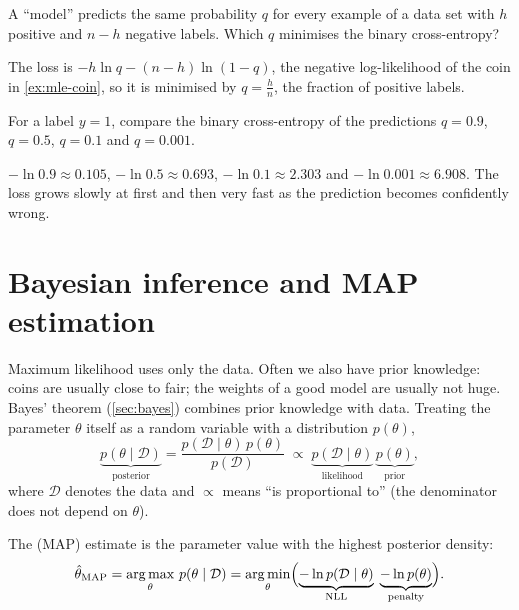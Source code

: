 \begin{exercise}
A ``model'' predicts the same probability $q$ for every example of a data set
with $h$ positive and $n - h$ negative labels. Which $q$ minimises the binary
cross-entropy?
\end{exercise}
\begin{solution}
The loss is $-h\ln q - (n - h)\ln(1 - q)$, the negative log-likelihood of the coin
in \cref{ex:mle-coin}, so it is minimised by $q = \tfrac hn$, the fraction of
positive labels.
\end{solution}

\begin{exercise}
For a label $y = 1$, compare the binary cross-entropy of the predictions
$q = 0.9$, $q = 0.5$, $q = 0.1$ and $q = 0.001$.
\end{exercise}
\begin{solution}
$-\ln0.9 \approx 0.105$, $-\ln0.5 \approx 0.693$, $-\ln0.1 \approx 2.303$ and
$-\ln0.001 \approx 6.908$. The loss grows slowly at first and then very fast as the
prediction becomes confidently wrong.
\end{solution}

\section{Bayesian inference and MAP estimation}\label{sec:map}

Maximum likelihood uses only the data. Often we also have prior knowledge: coins
are usually close to fair; the weights of a good model are usually not huge.
Bayes' theorem (\cref{sec:bayes}) combines prior knowledge with data. Treating
the parameter $\theta$ itself as a random variable with a 
distribution $p(\theta)$,
\[
  \underbrace{p(\theta \mid \mathcal{D})}_{\text{posterior}}
  = \frac{p(\mathcal{D} \mid \theta)\,p(\theta)}{p(\mathcal{D})}
  \;\propto\; \underbrace{p(\mathcal{D} \mid \theta)}_{\text{likelihood}}\,
  \underbrace{p(\theta)}_{\text{prior}} ,
\]
where $\mathcal{D}$ denotes the data and $\propto$ means ``is proportional to''
(the denominator does not depend on $\theta$).

\begin{definition}\label{def:map}
The  (MAP) estimate is the parameter
value with the highest posterior density:
\[
  \hat\theta_{\mathrm{MAP}} = \operatorname*{arg\,max}_\theta\, p(\theta \mid \mathcal{D})
  = \operatorname*{arg\,min}_\theta\Bigl(\underbrace{-\ln p(\mathcal{D} \mid \theta)}_{\text{NLL}}
  \;\underbrace{-\ln p(\theta)}_{\text{penalty}}\Bigr).
\]
\end{definition}

